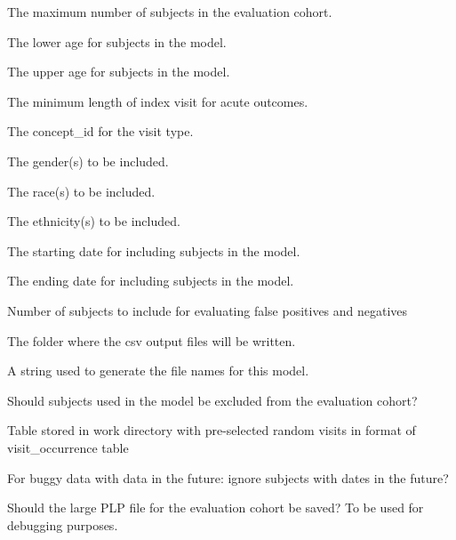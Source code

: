 \documentclass[a4paper]{book}
\begin{document}
\begin{Arguments}
\begin{ldescription}
\item[\code{baseSampleSize}] The maximum number of subjects in the evaluation cohort.

\item[\code{lowerAgeLimit}] The lower age for subjects in the model.

\item[\code{upperAgeLimit}] The upper age for subjects in the model.

\item[\code{visitLength}] The minimum length of index visit for acute outcomes.

\item[\code{visitType}] The concept\_id for the visit type.

\item[\code{gender}] The gender(s) to be included.

\item[\code{race}] The race(s) to be included.

\item[\code{ethnicity}] The ethnicity(s) to be included.

\item[\code{startDate}] The starting date for including subjects in the model.

\item[\code{endDate}] The ending date for including subjects in the model.

\item[\code{falsePositiveNegativeSubjects}] Number of subjects to include for evaluating false
positives and negatives

\item[\code{exportFolder}] The folder where the csv output files will be written.

\item[\code{modelId}] A string used to generate the file names for this model.

\item[\code{excludeModelFromEvaluation}] Should subjects used in the model be excluded from the
evaluation cohort?

\item[\code{randomVisitTable}] Table stored in work directory with pre-selected random
visits in format of visit\_occurrence table

\item[\code{removeSubjectsWithFutureDates}] For buggy data with data in the future: ignore subjects
with dates in the future?

\item[\code{saveEvaluationCohortPlpData}] Should the large PLP file for the evaluation cohort be
saved? To be used for debugging purposes.
\end{ldescription}
\end{Arguments}
\end{document}

